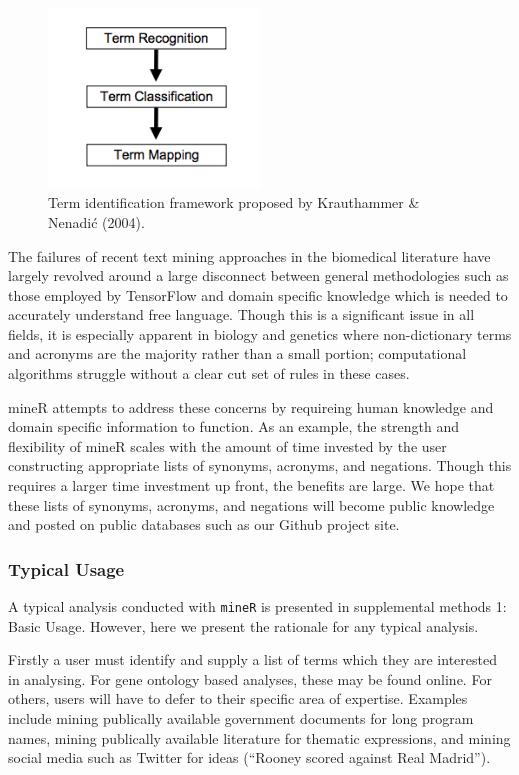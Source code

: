 \documentclass[twoside]{article}
\begin{document}
\begin{figure}[h]
\centering
\includegraphics[width=0.5\textwidth]{fig3.png}
\caption{Term identification framework proposed by Krauthammer \& Nenadić (2004).}
\end{figure}

The failures of recent text mining approaches in the biomedical literature have largely revolved around a large disconnect between general methodologies such as those employed by TensorFlow and domain specific knowledge which is needed to accurately understand free language. Though this is a significant issue in all fields, it is especially apparent in biology and genetics where non-dictionary terms and acronyms are the majority rather than a small portion; computational algorithms struggle without a clear cut set of rules in these cases.

mineR attempts to address these concerns by requireing human knowledge and domain specific information to function. As an example, the strength and flexibility of mineR scales with the amount of time invested by the user constructing appropriate lists of synonyms, acronyms, and negations. Though this requires a larger time investment up front, the benefits are large. We hope that these lists of synonyms, acronyms, and negations will become public knowledge and posted on public databases such as our Github project site. 


\subsubsection{Typical Usage}

A typical analysis conducted with \texttt{mineR} is presented in supplemental methods 1: Basic Usage. However, here we present the rationale for any typical analysis. 

Firstly a user must identify and supply a list of terms which they are interested in analysing. For gene ontology based analyses, these may be found online. For others, users will have to defer to their specific area of expertise. Examples include mining publically available government documents for long program names, mining publically available literature for thematic expressions, and mining social media such as Twitter for ideas (``Rooney scored against Real Madrid''). 
\end{document}
